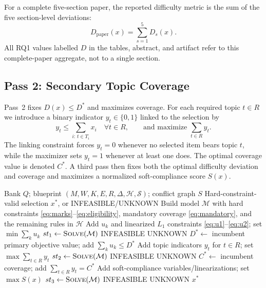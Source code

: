 \documentclass[runningheads]{llncs}
\begin{document}
For a complete five-section paper, the reported difficulty metric is the sum of the five section-level deviations:
\begin{equation}
D_{\mathrm{paper}}(x)=\sum_{s=1}^{5}D_s(x).
\label{eq:paperD}
\end{equation}
All RQ1 values labelled $D$ in the tables, abstract, and artifact refer to this complete-paper aggregate, not to a single section.

\subsection{Pass 2: Secondary Topic Coverage}
Pass~2 fixes $D(x)\le D^\ast$ and maximizes coverage.
For each required topic $t\in R$ we introduce a binary indicator $y_t\in\{0,1\}$ linked to the selection by
\begin{equation}
y_t \le \sum_{i:\,t\in T_i} x_i \quad \forall t\in R,\qquad \text{and maximize } \sum_{t\in R} y_t.
\end{equation}
The linking constraint forces $y_t=0$ whenever no selected item bears topic $t$, while the maximizer sets $y_t=1$ whenever at least one does.
The optimal coverage value is denoted $C^*$. A third pass then fixes both the optimal difficulty deviation and coverage and maximizes a normalized soft-compliance score $S(x)$.

\begin{algorithm}[t]
\caption{Three-pass lexicographic CP-SAT solver ($B1$)}
\label{alg:threepass}
\begin{algorithmic}[1]
\Require Bank $Q$; blueprint $(M,W,K,E,R,\Delta,\mathcal{H},\mathcal{S})$; conflict graph $S$
\Ensure Hard-constraint-valid selection $x^*$, or INFEASIBLE/UNKNOWN
\State Build model $\mathcal{M}$ with hard constraints \eqref{eq:marks}--\eqref{eq:eligibility}, mandatory coverage \eqref{eq:mandatory}, and the remaining rules in $\mathcal{H}$
\State Add $u_k$ and linearized $L_1$ constraints \eqref{eq:u1}--\eqref{eq:u2}; set $\min\sum_k u_k$
\State $st_1\gets\textsc{Solve}(\mathcal{M})$
 \State \Return INFEASIBLE \EndIf
{} \State \Return UNKNOWN \EndIf
{}
\State $D^*\gets$ incumbent primary objective value; add $\sum_k u_k\le D^*$
\State Add topic indicators $y_t$ for $t\in R$; set $\max\sum_{t\in R}y_t$
\State $st_2\gets\textsc{Solve}(\mathcal{M})$
 \State \Return INFEASIBLE \EndIf
{} \State \Return UNKNOWN \EndIf
{}
\State $C^*\gets$ incumbent coverage; add $\sum_{t\in R}y_t=C^*$
\State Add soft-compliance variables/linearizations; set $\max S(x)$
\State $st_3\gets\textsc{Solve}(\mathcal{M})$
 \State \Return INFEASIBLE \EndIf
{} \State \Return UNKNOWN \EndIf
{}
\State \Return $x^*$
\end{algorithmic}
\end{algorithm}
\end{document}
